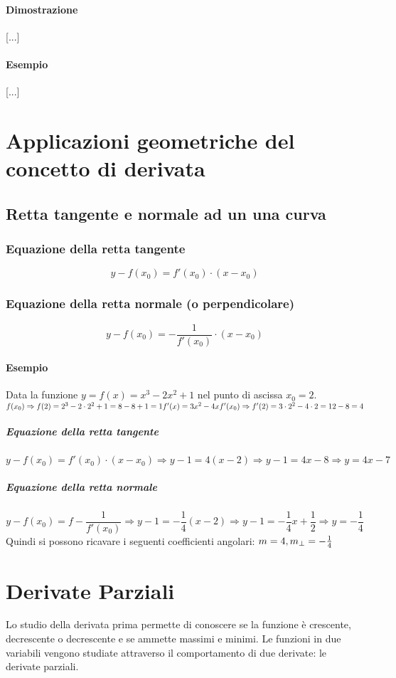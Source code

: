 \documentclass[a4paper,14pt]{extarticle}
\begin{document}
\paragraph{Dimostrazione \\}
[...]
\paragraph{Esempio \\}
[...]

\section{Applicazioni geometriche del concetto di derivata}
\subsection{Retta tangente e normale ad un una curva}
\subsubsection{Equazione della retta tangente}
\large \[y-f(x_0)=f'(x_0) \cdot(x-x_0)\] \normalsize
\subsubsection{Equazione della retta normale (o perpendicolare)}
\large \[y-f(x_0)=- \frac{1}{f'(x_0)} \cdot(x-x_0)\] \normalsize
\paragraph{Esempio \\} Data la funzione $y=f(x)=x^3-2x^2+1$ nel punto di ascissa $x_0=2$. $\\ f(x_0) \Rightarrow f(2)=2^3-2 \cdot 2^2+1=8-8+1=1 \\ f'(x)=3x^2-4x \\ f'(x_0) \Rightarrow f'(2)=3 \cdot 2^2-4\cdot2 = 12-8=4$
\subparagraph{Equazione della retta tangente} \[ y-f(x_0)=f'(x_0) \cdot(x-x_0) \Rightarrow y-1=4(x-2)\Rightarrow y-1=4x-8 \Rightarrow y=4x-7 \]
\subparagraph{Equazione della retta normale}  \[ y-f(x_0)=f- \frac{1}{f'(x_0)} \Rightarrow y-1=-\frac{1}{4}(x-2) \Rightarrow y-1=-\frac{1}{4}x+\frac{1}{2} \Rightarrow y=-\frac{1}{4} \] Quindi si possono ricavare i seguenti coefficienti angolari: $\\ m=4, m_\perp = - \frac{1}{4}$

\section{Derivate Parziali}
Lo studio della derivata prima permette di conoscere se la funzione è crescente, decrescente o decrescente e se ammette massimi e minimi. Le funzioni in due variabili vengono studiate attraverso il comportamento di due derivate: le derivate parziali.
\end{document}
